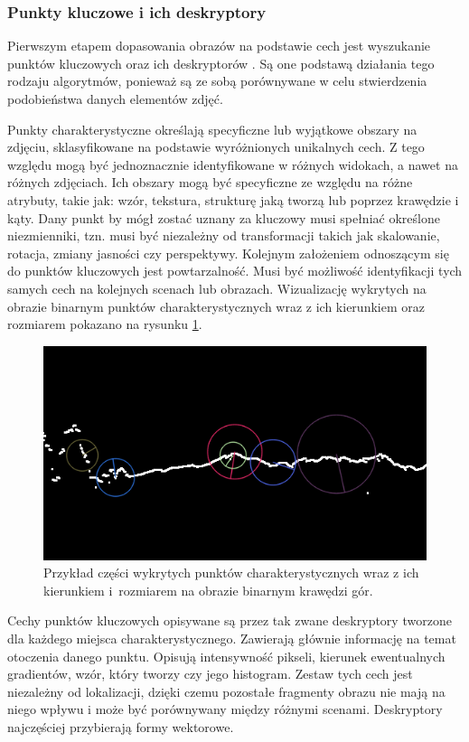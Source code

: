 \subsubsection{Punkty kluczowe i ich deskryptory} \label{sec:feature_matching_keypoints}

Pierwszym etapem dopasowania obrazów na podstawie cech jest wyszukanie punktów kluczowych oraz ich deskryptorów \cite{affine_point}\cite{feature_cornell}. Są one podstawą działania tego rodzaju algorytmów, ponieważ są ze sobą porównywane w celu stwierdzenia podobieństwa danych elementów zdjęć.

Punkty charakterystyczne określają specyficzne lub wyjątkowe obszary na zdjęciu, sklasyfikowane na podstawie wyróżnionych unikalnych cech. Z tego względu mogą być jednoznacznie identyfikowane w różnych widokach, a nawet na różnych zdjęciach. Ich obszary mogą być specyficzne ze względu na różne atrybuty, takie jak: wzór, tekstura, strukturę jaką tworzą lub poprzez krawędzie i kąty. Dany punkt by mógł zostać uznany za kluczowy musi spełniać określone niezmienniki, tzn. musi być niezależny od transformacji takich jak skalowanie, rotacja, zmiany jasności czy perspektywy. Kolejnym założeniem odnoszącym się do punktów kluczowych jest powtarzalność. Musi być możliwość identyfikacji tych samych cech na kolejnych scenach lub obrazach. Wizualizację wykrytych na obrazie binarnym punktów charakterystycznych wraz z ich kierunkiem oraz rozmiarem pokazano na rysunku \ref{fig:feature_keypoints}.

\begin{figure}[!h]
    \centering \includegraphics[width=0.6\linewidth]{img/keypoints.png}
    \caption{Przykład części wykrytych punktów charakterystycznych wraz z ich kierunkiem i~rozmiarem na obrazie binarnym krawędzi gór.}
    \label{fig:feature_keypoints}
\end{figure}


Cechy punktów kluczowych opisywane są przez tak zwane deskryptory tworzone dla każdego miejsca charakterystycznego. Zawierają głównie informację na temat otoczenia danego punktu. Opisują intensywność pikseli, kierunek ewentualnych gradientów, wzór, który tworzy czy jego histogram. Zestaw tych cech jest niezależny od lokalizacji, dzięki czemu pozostałe fragmenty obrazu nie mają na niego wpływu i może być porównywany między różnymi scenami. Deskryptory najczęściej przybierają formy wektorowe. 

